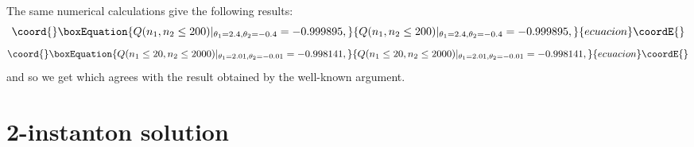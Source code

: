 \documentclass[a4paper,a4paper]{article}
\begin{document}
The same numerical calculations give the following results:
\begin{equation}\coord{}\boxEquation{
Q(n_1,n_2\leq 200)|_{\theta_1=2.4,\theta_2=-0.4}=-0.999895,
}{
Q(n_1,n_2\leq 200)|_{\theta_1=2.4,\theta_2=-0.4}=-0.999895,
}{ecuacion}\coordE{}\end{equation}
\begin{equation}\coord{}\boxEquation{
Q(n_1\leq 20,n_2\leq 2000)|_{\theta_1=2.01,\theta_2=-0.01}
=-0.998141,
}{
Q(n_1\leq 20,n_2\leq 2000)|_{\theta_1=2.01,\theta_2=-0.01}
=-0.998141,
}{ecuacion}\coordE{}\end{equation}
and so we get \coordHE{} which agrees with the result obtained by the
well-known argument.

\section{\coordHE{} 2-instanton solution}
\end{document}
